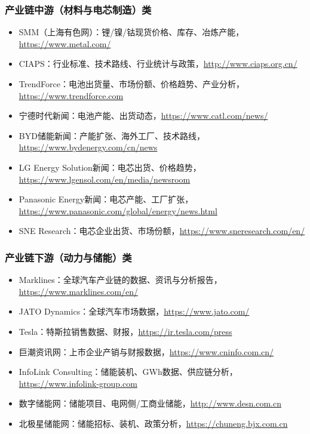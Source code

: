 ﻿\documentclass[12pt,a4paper]{article}
\begin{document}
\subsubsection{产业链中游（材料与电芯制造）类}
\begin{itemize}
    \item SMM（上海有色网）：锂/镍/钴现货价格、库存、冶炼产能，\url{https://www.metal.com/}
    \item CIAPS：行业标准、技术路线、行业统计与政策，\url{http://www.ciaps.org.cn/}
    \item TrendForce：电池出货量、市场份额、价格趋势、产业分析，\url{https://www.trendforce.com}
    \item 宁德时代新闻：电池产能、出货动态，\url{https://www.catl.com/news/}
    \item BYD储能新闻：产能扩张、海外工厂、技术路线，\url{https://www.bydenergy.com/cn/news}
    \item LG Energy Solution新闻：电芯出货、价格趋势，\url{https://www.lgensol.com/en/media/newsroom}
    \item Panasonic Energy新闻：电芯产能、工厂扩张，\url{https://www.panasonic.com/global/energy/news.html}
    \item SNE Research：电芯企业出货、市场份额，\url{https://www.sneresearch.com/en/}
\end{itemize}

\subsubsection{产业链下游（动力与储能）类}
\begin{itemize}
    \item Marklines：全球汽车产业链的数据、资讯与分析报告，\url{https://www.marklines.com/en/}
    \item JATO Dynamics：全球汽车市场数据，\url{https://www.jato.com/}
    \item Tesla：特斯拉销售数据、财报，\url{https://ir.tesla.com/press}
    \item 巨潮资讯网：上市企业产销与财报数据，\url{https://www.cninfo.com.cn/}
    \item InfoLink Consulting：储能装机、GWh数据、供应链分析，\url{https://www.infolink-group.com}
    \item 数字储能网：储能项目、电网侧/工商业储能，\url{http://www.desn.com.cn}
    \item 北极星储能网：储能招标、装机、政策分析，\url{https://chuneng.bjx.com.cn}
\end{itemize}
\end{document}
